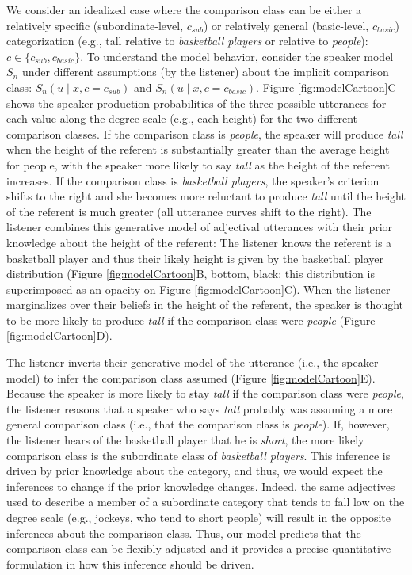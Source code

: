 \documentclass[doc]{apa6}
\begin{document}
We consider an idealized case where the comparison class can be either a relatively specific (subordinate-level, \(c_{sub}\)) or relatively general (basic-level, \(c_{basic}\)) categorization (e.g., tall relative to \emph{basketball players} or relative to \emph{people}): \(c \in \{c_{sub}, c_{basic}\}\).
To understand the model behavior, consider the speaker model \(S_n\) under different assumptions (by the listener) about the implicit comparison class: \(S_{n}(u \mid x, c = c_{sub})\) and \(S_{n}(u \mid x, c = c_{basic})\). 
Figure \ref{fig:modelCartoon}C shows the speaker production probabilities of the three possible utterances for each value along the degree scale (e.g., each height) for the two different comparison classes.  If the comparison class is \emph{people}, the speaker will produce \emph{tall} when the height of the referent is substantially greater than the average height for people, with the speaker more likely to say \emph{tall} as the height of the referent increases.
  If the comparison class is \emph{basketball players}, the speaker's criterion shifts to the right and she becomes more reluctant to produce \emph{tall} until the height of the referent is much greater (all utterance curves shift to the right). 
  The listener combines this generative model of adjectival utterances with their prior knowledge about the height of the referent: The listener knows the referent is a basketball player and thus their likely height is given by the basketball player distribution (Figure \ref{fig:modelCartoon}B, bottom, black; this distribution is superimposed as an opacity on Figure \ref{fig:modelCartoon}C).
  When the listener marginalizes over their beliefs in the height of the referent, the speaker is thought to be more likely to produce \emph{tall} if the comparison class were \emph{people} (Figure \ref{fig:modelCartoon}D).  

The listener inverts their generative model of the utterance (i.e., the speaker model) to infer the comparison class assumed (Figure \ref{fig:modelCartoon}E).
Because the speaker is more likely to stay \emph{tall} if the comparison class were \emph{people}, the listener reasons that a speaker who says \emph{tall} probably was assuming a more general comparison class (i.e., that the comparison class is \emph{people}). 
If, however, the listener hears of the basketball player that he is \emph{short}, the more likely comparison class is the subordinate class of \emph{basketball players}.
This inference is driven by prior knowledge about the category, and thus, we would expect the inferences to change if the prior knowledge changes.
Indeed, the same adjectives used to describe a member of a subordinate category that tends to fall low on the degree scale (e.g., jockeys, who tend to short people) will result in the opposite inferences about the comparison class. 
Thus, our model predicts that the comparison class can be flexibly adjusted and it provides a precise quantitative formulation in how this inference should be driven. 
\end{document}

